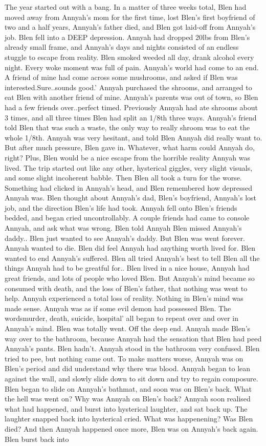 \documentclass[12pt]{book}
\begin{document}
The year started out with a bang. In a matter of three weeks total, Blen had moved away from Annyah's mom for the first time, lost Blen's first boyfriend of two and a half years, Annyah's father died, and Blen got laid-off from Annyah's job. Blen fell into a DEEP depression. Annyah had dropped 20lbs from Blen's already small frame, and Annyah's days and nights consisted of an endless stuggle to escape from reality. Blen smoked weeded all day, drank alcohol every night. Every woke moment was full of pain. Annyah's world had come to an end. A friend of mine had come across some mushrooms, and asked if Blen was interested.Sure..sounds good.' Annyah purchased the shrooms, and arranged to eat Blen with another friend of mine. Annyah's parents was out of town, so Blen had a few friends over..perfect timed. Previously Annyah had ate shrooms about 3 times, and all three times Blen had split an 1/8th three ways. Annyah's friend told Blen that was such a waste, the only way to really shroom was to eat the whole 1/8th. Annyah was very hesitant, and told Blen Annyah did really want to. But after much pressure, Blen gave in. Whatever, what harm could Annyah do, right? Plus, Blen would be a nice escape from the horrible reality Annyah was lived. The trip started out like any other, hysterical giggles, very slight visuals, and some slight incoherent babble. Then Blen all took a turn for the worse. Something had clicked in Annyah's head, and Blen remembered how depressed Annyah was. Blen thought about Annyah's dad, Blen's boyfriend, Annyah's lost job, and the direction Blen's life had took. Annyah fell onto Blen's friends bedded, and began cried uncontrollably. A couple friends had came to console Annyah, and ask what was wrong. Blen told Annyah Blen missed Annyah's daddy.. Blen just wanted to see Annyah's daddy. But Blen was went forever. Annyah wanted to die. Blen did feel Annyah had anything worth lived for. Blen wanted to end Annyah's suffered. Blen all tried Annyah's best to tell Blen all the things Annyah had to be greatful for.. Blen lived in a nice house, Annyah had great friends, and lots of people who loved Blen. But Annyah's mind became so consumed with death, and the loss of Blen's father, that nothing was went to help. Annyah experienced a total loss of reality. Nothing in Blen's mind was made sense. Annyah was as if some evil demon had possessed Blen. The wordsmurder, death, suicide, hospital' all began to repeat over and over in Annyah's mind. Blen was totally went. Off the deep end. Annyah made Blen's way over to the bathroom, because Annyah had the sensation that Blen had peed Annyah's pants. Blen hadn't. Annyah stood in the bathroom very confused. Blen tried to pee, but nothing came out. To make matters worse, Annyah was on Blen's period and did understand why there was blood. Annyah began to lean against the wall, and slowly slide down to sit down and try to regain composure. Blen began to slide on Annyah's bathmat, and soon was on Blen's back. What the hell was went on? Why was Annyah on Blen's back? Annyah soon realised what had happened, and burst into hysterical laughter, and sat back up. The laughter snapped back into hysterical cried. What was happenening? Was Blen died? And then Annyah happened once more, Blen was on Annyah's back again. Blen burst back into 
\end{document}
